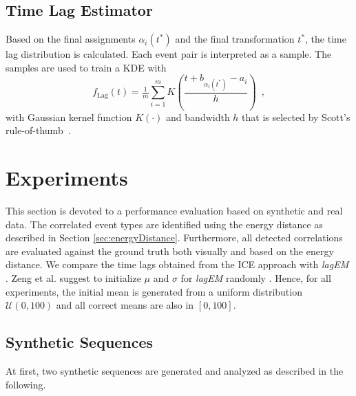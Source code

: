 \documentclass[conference]{IEEEtran}
\theoremstyle{examplestyle}
\begin{document}
\subsection{Time Lag Estimator} \label{sec:labestimator}
Based on the final assignments $\alpha_i(t^*)$ and the final transformation $t^*$, the time lag distribution is calculated. Each event pair is interpreted as a sample. The samples are used to train a \ac{KDE} with
\begin{equation}
	\label{eq:solutionICP}
 f_{\text{Lag}}(t) = \tfrac{1}{m}  \sum_{i=1}^m  K\left( \frac{t+ b_{\alpha_i(t^*)} - a_i }{ h} \right)  \enspace ,
	\end{equation}
with Gaussian kernel function $K(\cdot)$ and bandwidth $h$ that is selected by Scott's rule-of-thumb~\cite{Scott1992}.











\section{Experiments} \label{sec:exp}

This section is devoted to a performance evaluation based on synthetic and real data. The correlated event types are identified using the energy distance as described in Section \ref{sec:energyDistance}. Furthermore, all detected correlations are evaluated against the  ground truth both visually and based on the energy distance.
We compare the time lags obtained from the  \ac{ICE} approach  with \textit{lagEM} \cite{Zeng2015}. %
Zeng et al. suggest to  initialize \(\mu\) and \(\sigma\) for  \textit{lagEM} randomly \cite{Zeng2015}. Hence, for all  experiments, the initial mean is generated from a uniform distribution \(\mathcal{U}(0, 100)\) and all correct means are also in \([0, 100]\).





\subsection{Synthetic Sequences}
At first,  two synthetic sequences  are generated and analyzed as described in the following.
\end{document}
